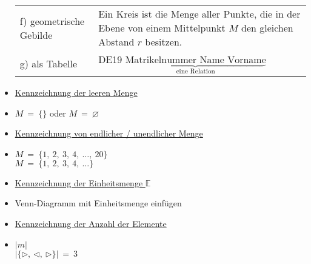 \begin{itemize}[leftmargin=*]
\begin{tabular}{@{}l p{9cm}}
                            f) geometrische Gebilde         & Ein Kreis ist die Menge aller Punkte, die in der Ebene von einem Mittelpunkt $M$ den gleichen Abstand $r$ besitzen.\\
                            g) als Tabelle                  & DE19 \quad $\underbrace{\text{Matrikelnummer \ Name \ Vorname}}_{\text{eine Relation}}$ \\
                            \end{tabular}
                        \item \underline{Kennzeichnung der leeren Menge}
                        \item[] $M \ = \ \{\}$ oder $M \ = \ \varnothing$
                        \item \underline{Kennzeichnung von endlicher / unendlicher Menge}
                        \item[] $ M \ = \ \{ 1,\ 2,\ 3, \ 4, \ \ldots, \ 20\} $ \\
                                $ M \ = \ \{ 1,\ 2,\ 3, \ 4, \ \ldots \} $
                        \item \underline{Kennzeichnung der Einheitsmenge $\mathbb{E}$}
                        \item[] Venn-Diagramm mit Einheitsmenge einfügen
                        \item \underline{Kennzeichnung der Anzahl der Elemente}
                        \item[] $|m| $ \\ $|\{\rhd,\ \triangleleft,\ \triangleright \}| \ = \ 3$
                    \end{itemize}

